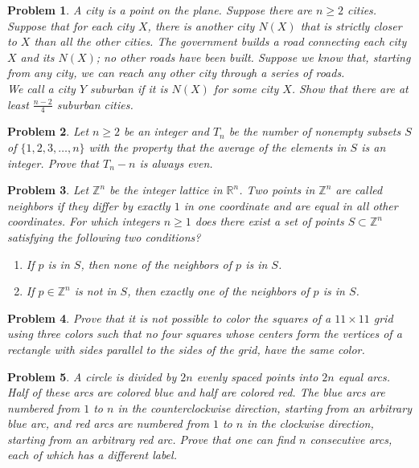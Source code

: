 \documentclass[12pt]{article}
\newtheorem{problem}{Problem}
\begin{document}
\begin{problem}
A city is a point on the plane. Suppose there are $n \geq 2$ cities. Suppose that for each city $X$, there is another city $N(X)$ that is strictly closer to $X$ than all the other cities. The government builds a road connecting each city $X$ and its $N(X)$; no other roads have been built. Suppose we know that, starting from any city, we can reach any other city through a series of roads.\\
We call a city $Y$ \emph{suburban} if it is $N(X)$ for some city $X$. Show that there are at least $\frac{n-2}{4}$ suburban cities.
\end{problem}

\begin{problem}
Let $n \geq 2$ be an integer and $T_n$ be the number of nonempty subsets $S$ of $\{1, 2, 3, \ldots, n\}$ with the property that the average of the elements in $S$ is an integer. Prove that $T_n - n$ is always even.
\end{problem}

\begin{problem}
Let $\mathbb{Z}^n$ be the integer lattice in $\mathbb{R}^n$. Two points in $\mathbb{Z}^n$ are called neighbors if they differ by exactly $1$ in one coordinate and are equal in all other coordinates. For which integers $n \geq 1$ does there exist a set of points $S \subset \mathbb{Z}^n$ satisfying the following two conditions?
\begin{enumerate}
    \item If $p$ is in $S$, then none of the neighbors of $p$ is in $S$.
    \item If $p \in \mathbb{Z}^n$ is not in $S$, then exactly one of the neighbors of $p$ is in $S$.
\end{enumerate}
\end{problem}

\begin{problem}
Prove that it is not possible to color the squares of a $11 \times 11$ grid using three colors such that no four squares whose centers form the vertices of a rectangle with sides parallel to the sides of the grid, have the same color.
\end{problem}

\begin{problem}
A circle is divided by $2n$ evenly spaced points into $2n$ equal arcs. Half of these arcs are colored blue and half are colored red. The blue arcs are numbered from $1$ to $n$ in the counterclockwise direction, starting from an arbitrary blue arc, and red arcs are numbered from $1$ to $n$ in the clockwise direction, starting from an arbitrary red arc. Prove that one can find $n$ consecutive arcs, each of which has a different label.
\end{problem}
\end{document}
